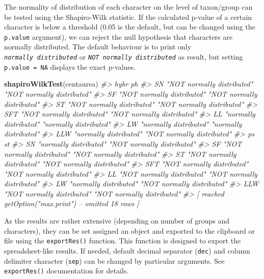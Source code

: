 \documentclass[
]{article}
\newenvironment{Shaded}{\begin{snugshade}}{\end{snugshade}}
\newcommand{\CommentTok}[1]{\textcolor[rgb]{0.56,0.35,0.01}{\textit{#1}}}
\newcommand{\KeywordTok}[1]{\textcolor[rgb]{0.13,0.29,0.53}{\textbf{#1}}}
\newcommand{\NormalTok}[1]{#1}
\begin{document}
The normality of distribution of each character on the level of
taxon/group can be tested using the Shapiro-Wilk statistic. If the
calculated p-value of a certain character is below a threshold (0.05 is
the default, but can be changed using the \texttt{p.value} argument), we
can reject the null hypothesis that characters are normally distributed.
The default behaviour is to print only
\emph{\texttt{normally\ distributed}} or
\emph{\texttt{NOT\ normally\ distributed}} as result, but setting
\texttt{p.value\ =\ NA} displays the exact p-values.

\begin{Shaded}
\begin{Highlighting}[]
\KeywordTok{shapiroWilkTest}\NormalTok{(centaurea)}
\CommentTok{#>     hybr                       ph                        }
\CommentTok{#> SN  "NOT normally distributed" "NOT normally distributed"}
\CommentTok{#> SF  "NOT normally distributed" "NOT normally distributed"}
\CommentTok{#> ST  "NOT normally distributed" "NOT normally distributed"}
\CommentTok{#> SFT "NOT normally distributed" "NOT normally distributed"}
\CommentTok{#> LL  "normally distributed"     "normally distributed"    }
\CommentTok{#> LW  "normally distributed"     "normally distributed"    }
\CommentTok{#> LLW "normally distributed"     "NOT normally distributed"}
\CommentTok{#>     ps                         st                        }
\CommentTok{#> SN  "normally distributed"     "NOT normally distributed"}
\CommentTok{#> SF  "NOT normally distributed" "NOT normally distributed"}
\CommentTok{#> ST  "NOT normally distributed" "NOT normally distributed"}
\CommentTok{#> SFT "NOT normally distributed" "NOT normally distributed"}
\CommentTok{#> LL  "NOT normally distributed" "NOT normally distributed"}
\CommentTok{#> LW  "normally distributed"     "NOT normally distributed"}
\CommentTok{#> LLW "NOT normally distributed" "NOT normally distributed"}
\CommentTok{#>  [ reached getOption("max.print") -- omitted 18 rows ]}
\end{Highlighting}
\end{Shaded}

As the results are rather extensive (depending on number of groups and
characters), they can be set assigned an object and exported to the
clipboard or file using the \texttt{exportRes()} function. This function
is designed to export the spreadsheet-like results. If needed, default
decimal separator (\texttt{dec}) and column delimiter character
(\texttt{sep}) can be changed by particular arguments. See
\texttt{exportRes()} documentation for details.
\end{document}
